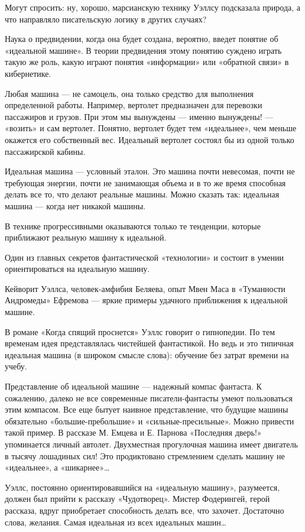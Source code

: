 Могут спросить: ну, хорошо, марсианскую технику Уэллсу подсказала природа,
а что направляло писательскую логику в других случаях?

Наука о предвидении, когда она будет создана, вероятно, введет понятие  об
«идеальной машине».  В теории  предвидения  этому понятию  суждено  играть
такую же роль, какую  играют понятия «информации»  или «обратной связи»  в
кибернетике.

Любая  машина  —   не  самоцель,  она   только  средство  для   выполнения
определенной  работы.  Например,   вертолет  предназначен  для   перевозки
пассажиров и грузов. При этом мы вынуждены — именно вынуждены! —  «возить»
и сам  вертолет.  Понятно,  вертолет будет  тем  «идеальнее»,  чем  меньше
окажется его  собственный  вес. Идеальный  вертолет  состоял бы  из  одной
только пассажирской кабины.

Идеальная машина — условный эталон.  Это машина почти невесомая, почти  не
требующая энергии, почти не  занимающая объема и в  то же время  способная
делать все то, что  делают реальные машины.  Можно сказать так:  идеальная
машина — когда нет никакой машины.

В  технике  прогрессивными  оказываются   только  те  тенденции,   которые
приближают реальную машину к идеальной.

Один из главных  секретов фантастической «технологии»  и состоит в  умении
ориентироваться на идеальную машину.

Кейворит Уэллса,  человек-амфибия Беляева,  опыт Мвен  Маса в  «Туманности
Андромеды» Ефремова  —  яркие  примеры удачного  приближения  к  идеальной
машине.

В романе  «Когда спящий  проснется»  Уэллс говорит  о гипнопедии.  По  тем
временам идея представлялась чистейшей фантастикой. Но ведь и это типичная
идеальная машина (в широком смысле слова): обучение без затрат времени  на
учебу.

Представление об идеальной машине — надежный компас фантаста. К сожалению,
далеко  не  все  современные  писатели-фантасты  умеют  пользоваться  этим
компасом.  Все  еще  бытует  наивное  представление,  что  будущие  машины
обязательно «большие-пребольшие»  и «сильные-пресильные».  Можно  привести
такой пример.  В  рассказе  М.  Емцева и  Е.  Парнова  «Последняя  дверь!»
упоминается личный автолет. Двухместная прогулочная машина имеет двигатель
в тысячу лошадиных  сил! Это  продиктовано стремлением  сделать машину  не
«идеальнее», а «шикарнее»…

Уэллс, постоянно  ориентировавшийся  на  «идеальную  машину»,  разумеется,
должен был  прийти  к  рассказу  «Чудотворец».  Мистер  Фодерингей,  герой
рассказа,  вдруг  приобретает   способность  делать   все,  что   захочет.
Достаточно слова, желания. Самая идеальная из всех идеальных машин…

